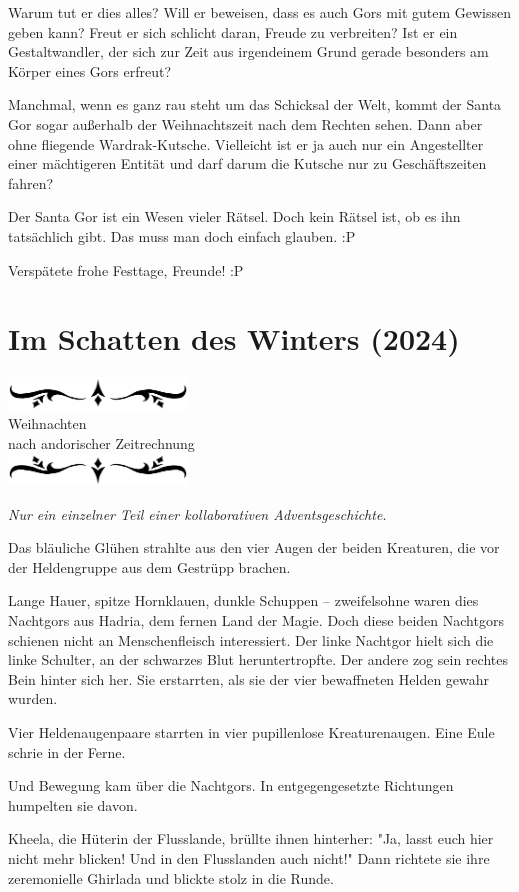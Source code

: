 \documentclass[10pt, a4paper, oneside]{book}
\newcommand{\az}[1]{%
    \begin{center}
        \includegraphics[width=180px]{Das Erbe des Wunderkindes/verzierung1.png}\\
        {\Huge #1} \\
        {nach andorischer Zeitrechnung}\\
        \includegraphics[width=180px]{Das Erbe des Wunderkindes/verzierung2.png}
    \end{center}
    \extramarks{}{#1 a.Z.}
}
\begin{document}
Warum tut er dies alles? Will er beweisen, dass es auch Gors mit gutem Gewissen geben kann? Freut er sich schlicht daran, Freude zu verbreiten? Ist er ein Gestaltwandler, der sich zur Zeit aus irgendeinem Grund gerade besonders am Körper eines Gors erfreut?

Manchmal, wenn es ganz rau steht um das Schicksal der Welt, kommt der Santa Gor sogar außerhalb der Weihnachtszeit nach dem Rechten sehen. Dann aber ohne fliegende Wardrak-Kutsche. Vielleicht ist er ja auch nur ein Angestellter einer mächtigeren Entität und darf darum die Kutsche nur zu Geschäftszeiten fahren?

Der Santa Gor ist ein Wesen vieler Rätsel. Doch kein Rätsel ist, ob es ihn tatsächlich gibt. Das muss man doch einfach glauben. :P\bigskip



Verspätete frohe Festtage, Freunde! :P






\newpage
\section{Im Schatten des Winters (2024)}

\az{Weihnachten}

\textit{Nur ein einzelner Teil einer kollaborativen Adventsgeschichte.}\bigskip

Das bläuliche Glühen strahlte aus den vier Augen der beiden Kreaturen, die vor der Heldengruppe aus dem Gestrüpp brachen.

Lange Hauer, spitze Hornklauen, dunkle Schuppen – zweifelsohne waren dies Nachtgors aus Hadria, dem fernen Land der Magie. Doch diese beiden Nachtgors schienen nicht an Menschenfleisch interessiert. Der linke Nachtgor hielt sich die linke Schulter, an der schwarzes Blut heruntertropfte. Der andere zog sein rechtes Bein hinter sich her. Sie erstarrten, als sie der vier bewaffneten Helden gewahr wurden.

Vier Heldenaugenpaare starrten in vier pupillenlose Kreaturenaugen.
Eine Eule schrie in der Ferne.

Und Bewegung kam über die Nachtgors. In entgegengesetzte Richtungen humpelten sie davon.

Kheela, die Hüterin der Flusslande, brüllte ihnen hinterher: "Ja, lasst euch hier nicht mehr blicken! Und in den Flusslanden auch nicht!" Dann richtete sie ihre zeremonielle Ghirlada und blickte stolz in die Runde.
\end{document}
